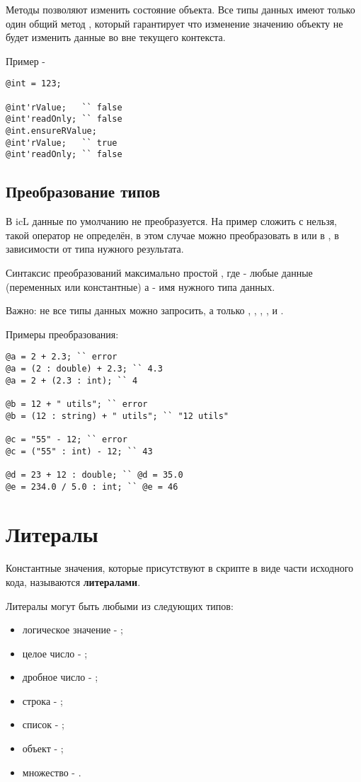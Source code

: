 \documentclass[a4paper, 14pt]{extarticle}
\newenvironment{icItems}
	{ \begin{itemize} [noitemsep,nolistsep] }
	{ \end{itemize} }
\begin{document}
Методы позволяют изменить состояние объекта. Все типы данных имеют только один общий метод , который гарантирует что изменение значению объекту не будет изменить данные во вне текущего контекста.

\noindent Пример -
\begin{lstlisting}
@int = 123;

@int'rValue;   `` false
@int'readOnly; `` false
@int.ensureRValue;
@int'rValue;   `` true
@int'readOnly; `` false
\end{lstlisting}

\subsection{Преобразование типов}

В icL данные по умолчанию не преобразуется. На пример сложить \integer с \double нельзя, такой оператор не определён, в этом случае можно преобразовать \integer в \double или \double в \integer, в зависимости от типа нужного результата.

Синтаксис преобразований максимально простой , где  - любые данные (переменных или константные) а  - имя нужного типа данных.

{\color{red} Важно:} не все типы данных можно запросить, а только \bool, \integer, \double, \str, \listtype и \object.

\noindent Примеры преобразования:
\begin{lstlisting}
@a = 2 + 2.3; `` error
@a = (2 : double) + 2.3; `` 4.3
@a = 2 + (2.3 : int); `` 4

@b = 12 + " utils"; `` error
@b = (12 : string) + " utils"; `` "12 utils"

@c = "55" - 12; `` error
@c = ("55" : int) - 12; `` 43

@d = 23 + 12 : double; `` @d = 35.0
@e = 234.0 / 5.0 : int; `` @e = 46
\end{lstlisting}

\newpage
\section{Литералы}

Константные значения, которые присутствуют в скрипте в виде части исходного кода, называются {\bf литералами}.

Литералы могут быть любыми из следующих типов:

\begin{icItems}
	\item
		логическое значение - \bool;
	\item
		целое число - \integer;
	\item
		дробное число - \double;
	\item
		строка - \str;
	\item
		список - \listtype;
	\item
		объект - \object;
	\item
		множество - \set.
\end{icItems}
\end{document}
